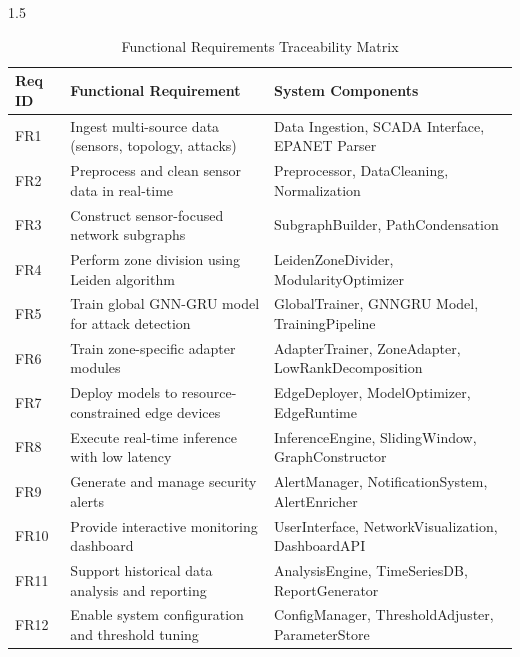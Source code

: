 \begin{spacing}{1.5}
\begin{table}[H]
\centering
\small
\begin{tabularx}{\textwidth}{|l|X|X|}
\hline
\textbf{Req ID} & \textbf{Functional Requirement} & \textbf{System Components} \\
\hline
FR1 & Ingest multi-source data (sensors, topology, attacks) & Data Ingestion, SCADA Interface, EPANET Parser \\
\hline
FR2 & Preprocess and clean sensor data in real-time & Preprocessor, DataCleaning, Normalization \\
\hline
FR3 & Construct sensor-focused network subgraphs & SubgraphBuilder, PathCondensation \\
\hline
FR4 & Perform zone division using Leiden algorithm & LeidenZoneDivider, ModularityOptimizer \\
\hline
FR5 & Train global GNN-GRU model for attack detection & GlobalTrainer, GNNGRU Model, TrainingPipeline \\
\hline
FR6 & Train zone-specific adapter modules & AdapterTrainer, ZoneAdapter, LowRankDecomposition \\
\hline
FR7 & Deploy models to resource-constrained edge devices & EdgeDeployer, ModelOptimizer, EdgeRuntime \\
\hline
FR8 & Execute real-time inference with low latency & InferenceEngine, SlidingWindow, GraphConstructor \\
\hline
FR9 & Generate and manage security alerts & AlertManager, NotificationSystem, AlertEnricher \\
\hline
FR10 & Provide interactive monitoring dashboard & UserInterface, NetworkVisualization, DashboardAPI \\
\hline
FR11 & Support historical data analysis and reporting & AnalysisEngine, TimeSeriesDB, ReportGenerator \\
\hline
FR12 & Enable system configuration and threshold tuning & ConfigManager, ThresholdAdjuster, ParameterStore \\
\hline
\end{tabularx}
\caption{Functional Requirements Traceability Matrix}
\end{table}

\clearpage %


\end{spacing}
